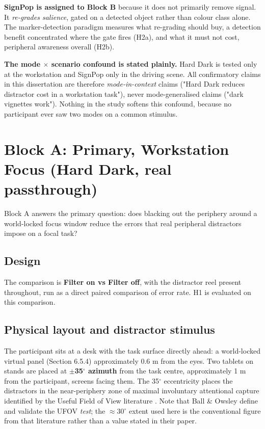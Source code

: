 \textbf{SignPop is assigned to Block B} because it does not primarily remove signal. It \textit{re-grades
salience}, gated on a detected object rather than colour class alone. The marker-detection paradigm
measures what re-grading should buy, a detection benefit concentrated where the gate fires (H2a), and
what it must not cost, peripheral awareness overall (H2b).

\textbf{The mode $\times$ scenario confound is stated plainly.} Hard Dark is tested only at the workstation and
SignPop only in the driving scene. All confirmatory claims in this dissertation are therefore
\textit{mode-in-context} claims ("Hard Dark reduces distractor cost in a workstation task"), never
mode-generalised claims ("dark vignettes work"). Nothing in the study softens this confound, because
no participant ever saw two modes on a common stimulus.

\section{Block A: Primary, Workstation Focus (Hard Dark, real passthrough)}

Block A answers the primary question: does blacking out the periphery around a world-locked focus
window reduce the errors that real peripheral distractors impose on a focal task?

\subsection{Design}

The comparison is \textbf{Filter on vs Filter off}, with the distractor reel present throughout, run as a
direct paired comparison of error rate. H1 is evaluated on this comparison.

\subsection{Physical layout and distractor stimulus}

The participant sits at a desk with the task surface directly ahead: a world-locked virtual panel
(Section 6.5.4) approximately 0.6 m from the eyes. Two tablets on stands are placed at \textbf{$\pm$35$^{\circ}$
azimuth} from the task centre, approximately 1 m from the participant, screens facing them. The 35$^{\circ}$
eccentricity places the distractors in the near-periphery zone of maximal involuntary attentional
capture identified by the Useful Field of View literature \citep{ball1993}. Note that Ball \&
Owsley define and validate the UFOV \textit{test}; the $\approx$30$^{\circ}$ extent used here is the conventional figure
from that literature rather than a value stated in their paper.

